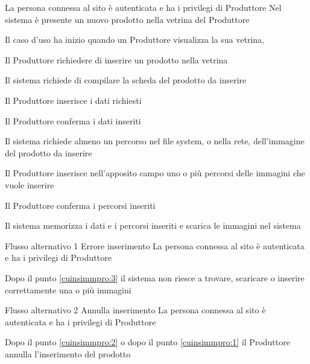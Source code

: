 
{}
{La persona connessa al sito è autenticata e ha i privilegi di Produttore}
{Nel sistema è presente un nuovo prodotto nella vetrina del Produttore}
{\begin{enumCU}
		\item Il caso d'uso ha inizio quando un Produttore visualizza la sua vetrina, 
		\item Il Produttore richiedere di inserire un prodotto nella vetrina
		\item Il sistema richiede di compilare la scheda del prodotto da inserire
		\item Il Produttore inserisce i dati richiesti \label{cuinsimmpro:1}
		\item Il Produttore conferma i dati inseriti 
		\item Il sistema richiede almeno un percorso nel file system, o nella rete, dell'immagine del prodotto da inserire
		\item Il Produttore inserisce nell'apposito campo uno o più percorsi  delle immagini che vuole inserire \label{cuinsimmpro:2}
		\item Il Produttore conferma i percorsi inseriti \label{cuinsimmpro:3}
		\item Il sistema memorizza i dati e i percorsi inseriti e scarica le immagini nel sistema
	\end{enumCU}}
%
{Flusso alternativo 1}%
{Errore inserimento}%
{La persona connessa al sito è autenticata e ha i privilegi di Produttore}%
{\postNulle}%
{\begin{enumCU}
		\item Dopo il punto \ref{cuinsimmpro:3} il sistema non riesce a trovare, scaricare o inserire correttamente una o più immagini
	\end{enumCU}}%
%
{Flusso alternativo 2}%
{Annulla inserimento}%
{La persona connessa al sito è autenticata e ha i privilegi di Produttore}%
{\postNulle}%
{\begin{enumCU}
		\item Dopo il punto \ref{cuinsimmpro:2} o dopo il punto \ref{cuinsimmpro:1} il Produttore annulla l'inserimento del prodotto
	\end{enumCU}}%


